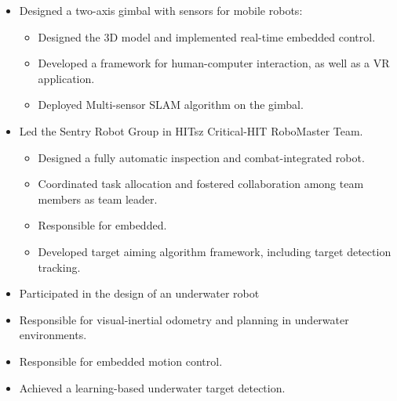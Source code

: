 \documentclass[11pt,a4paper]{moderncv}        %
\begin{document}
%
{
\begin{itemize}%
\item Designed a two-axis gimbal with sensors for mobile robots:
\begin{itemize}%
\item Designed the 3D model and implemented real-time embedded control.
\item Developed a framework for human-computer interaction, as well as a VR application.
\item Deployed Multi-sensor SLAM algorithm on the gimbal.  
\end{itemize}
\end{itemize}
}

%
{
\begin{itemize}%
\item Led the Sentry Robot Group in HITsz Critical-HIT RoboMaster Team.
\begin{itemize}
\item Designed a fully automatic inspection and combat-integrated robot.
\item Coordinated task allocation and fostered collaboration among team members as team leader.
\item Responsible for embedded. 
\item Developed target aiming algorithm framework, including target detection tracking.
\end{itemize}
\end{itemize}
}

%
{
\begin{itemize}%
    \item Participated in the design of an underwater robot  
    \item Responsible for visual-inertial odometry and planning in underwater environments.
    \item Responsible for embedded motion control.
    \item Achieved a learning-based underwater target detection.
\end{itemize}
}
%
{}
\end{document}
